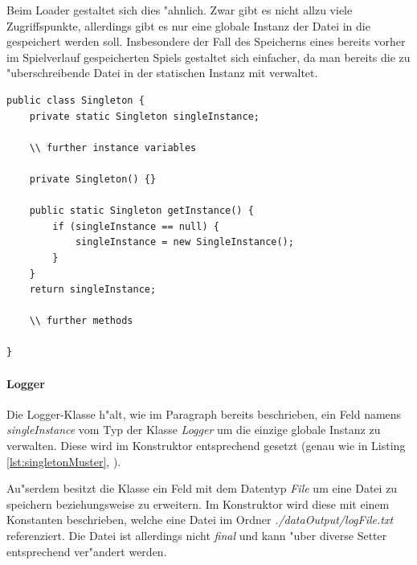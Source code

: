 Beim Loader gestaltet sich dies "ahnlich. Zwar gibt es nicht allzu viele Zugriffspunkte, allerdings gibt es nur eine globale Instanz der Datei in die gespeichert werden soll. Insbesondere der Fall des Speicherns eines bereits vorher im Spielverlauf gespeicherten Spiels gestaltet sich einfacher, da man bereits die zu "uberschreibende Datei in der statischen Instanz mit verwaltet. 
\begin{lstlisting}[float,style=CodeHighlighting,caption=Singleton-Muster,label=lst:singletonMuster]
public class Singleton {
	private static Singleton singleInstance; 
	
	\\ further instance variables
	
	private Singleton() {}
	
	public static Singleton getInstance() {
		if (singleInstance == null) {
			singleInstance = new SingleInstance(); 
		}
	}
	return singleInstance; 
	
	\\ further methods	
	
}
\end{lstlisting}

\paragraph{Logger}
\label{par:logger}
Die Logger-Klasse h"alt, wie im Paragraph  bereits beschrieben, ein Feld namens \emph{singleInstance} vom Typ der Klasse \emph{Logger} um die einzige globale Instanz zu verwalten. Diese wird im Konstruktor entsprechend gesetzt (genau wie in Listing \ref{lst:singletonMuster}, ). 

Au"serdem besitzt die Klasse ein Feld mit dem Datentyp \emph{File} um eine Datei zu speichern beziehungsweise zu erweitern. Im Konstruktor wird diese mit einem Konstanten beschrieben, welche eine Datei im Ordner \emph{./dataOutput/logFile.txt} referenziert. Die Datei ist allerdings nicht \emph{final} und kann "uber diverse Setter entsprechend ver"andert werden. 

